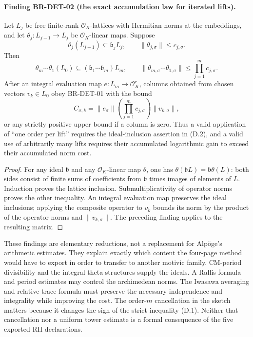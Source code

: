 \documentclass[11pt,a4paper]{article}
\theoremstyle{definition}\newtheorem{definition}[theorem]{Definition}
\theoremstyle{remark}\newtheorem{remark}[theorem]{Remark}
\begin{document}
\paragraph{Finding BR-DET-02 (the exact accumulation law for iterated lifts).}
Let $L_j$ be free finite-rank $\mathcal O_K$-lattices with Hermitian
norms at the embeddings, and let
$\theta_j:L_{j-1}\to L_j$ be $\mathcal O_K$-linear maps.
Suppose
\[
 \theta_j(L_{j-1})\subseteq\mathfrak b_jL_j,
 \qquad \|\theta_{j,\sigma}\|\leq c_{j,\sigma}.
\]
Then
\[
 \theta_m\cdots\theta_1(L_0)
   \subseteq(\mathfrak b_1\cdots\mathfrak b_m)L_m,
 \qquad
 \|\theta_{m,\sigma}\cdots\theta_{1,\sigma}\|
   \leq\prod_{j=1}^m c_{j,\sigma}.                            \tag{D.2}
\]
After an integral evaluation map $e:L_m\to\mathcal O_K^r$, columns
obtained from chosen vectors $v_k\in L_0$ obey BR-DET-01 with
the bound
\[
 C_{\sigma,k}=\|e_\sigma\|
       \left(\prod_{j=1}^m c_{j,\sigma}\right)\|v_{k,\sigma}\|,
\]
or any strictly positive upper bound if a column is zero.
Thus a valid application of ``one order
per lift'' requires the ideal-inclusion assertion in (D.2), and
a valid use of arbitrarily many lifts requires their accumulated
logarithmic gain to exceed their accumulated norm cost.

\begin{proof}
For any ideal $\mathfrak b$ and any $\mathcal O_K$-linear map
$\theta$, one has $\theta(\mathfrak bL)=\mathfrak b\theta(L)$:
both sides consist of finite sums of coefficients from
$\mathfrak b$ times images of elements of $L$.
Induction proves the lattice inclusion.  Submultiplicativity of
operator norms proves the other inequality.  An integral
evaluation map preserves the ideal inclusions; applying the
composite operator to $v_k$ bounds its norm by the product of
the operator norms and $\|v_{k,\sigma}\|$. The preceding
finding applies to the resulting matrix.
\end{proof}

These findings are elementary reductions, not a replacement for
Alp\"oge's arithmetic estimates.  They explain exactly which
content the four-page method would have to export in order to
transfer to another motivic family.  CM-period divisibility and
the integral theta structures supply the ideals.  A Rallis
formula and period estimates may control the archimedean norms.
The Iwasawa averaging and relative trace formula must preserve
the necessary independence and integrality while improving the
cost.  The order-$m$ cancellation in the sketch matters because
it changes the sign of the strict inequality (D.1).  Neither
that cancellation nor a uniform tower estimate is a formal
consequence of the five exported RH declarations.
\end{document}
